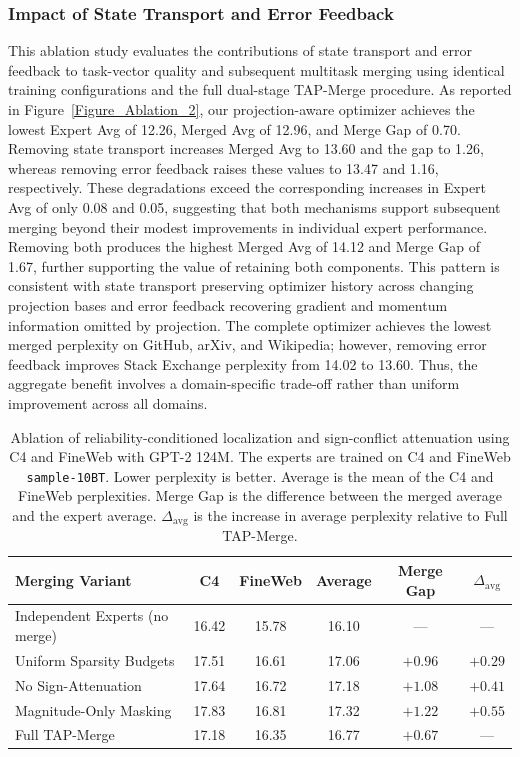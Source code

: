 \documentclass[fleqn,10pt]{wlscirep}
\begin{document}
\subsubsection{Impact of State Transport and Error Feedback}
\label{subsec:ablation_state_transport_error_feedback}
This ablation study evaluates the contributions of state transport and error feedback to task-vector quality and subsequent multitask merging using identical training configurations and the full dual-stage TAP-Merge procedure. As reported in Figure~\ref{Figure_Ablation_2}, our projection-aware optimizer achieves the lowest Expert Avg of 12.26, Merged Avg of 12.96, and Merge Gap of 0.70. Removing state transport increases Merged Avg to 13.60 and the gap to 1.26, whereas removing error feedback raises these values to 13.47 and 1.16, respectively. These degradations exceed the corresponding increases in Expert Avg of only 0.08 and 0.05, suggesting that both mechanisms support subsequent merging beyond their modest improvements in individual expert performance. Removing both produces the highest Merged Avg of 14.12 and Merge Gap of 1.67, further supporting the value of retaining both components. This pattern is consistent with state transport preserving optimizer history across changing projection bases and error feedback recovering gradient and momentum information omitted by projection. The complete optimizer achieves the lowest merged perplexity on GitHub, arXiv, and Wikipedia; however, removing error feedback improves Stack Exchange perplexity from 14.02 to 13.60. Thus, the aggregate benefit involves a domain-specific trade-off rather than uniform improvement across all domains.




\begin{table}[t]
\centering
\small
\caption{Ablation of reliability-conditioned localization and sign-conflict attenuation using C4 and FineWeb with GPT-2 124M. The experts are trained on C4 and FineWeb \texttt{sample-10BT}. Lower perplexity is better. Average is the mean of the C4 and FineWeb perplexities. Merge Gap is the difference between the merged average and the expert average. $\Delta_{\mathrm{avg}}$ is the increase in average perplexity relative to Full TAP-Merge.}
\label{tab:ablation_reliability_localization}
\begin{tabular}{lccccc}
\toprule
\textbf{Merging Variant}
& \textbf{C4}
& \textbf{FineWeb}
& \textbf{Average}
& \textbf{Merge Gap}
& $\Delta_{\mathrm{avg}}$ \\
\midrule
Independent Experts (no merge)
& 16.42 & 15.78 & 16.10 & --- & --- \\
\midrule
Uniform Sparsity Budgets
& 17.51 & 16.61 & 17.06 & $+0.96$ & $+0.29$ \\
No Sign-Attenuation
& 17.64 & 16.72 & 17.18 & $+1.08$ & $+0.41$ \\
Magnitude-Only Masking
& 17.83 & 16.81 & 17.32 & $+1.22$ & $+0.55$ \\
\midrule
Full TAP-Merge
& 17.18 & 16.35 & 16.77 & $+0.67$ & --- \\
\bottomrule
\end{tabular}
\end{table}
\end{document}
